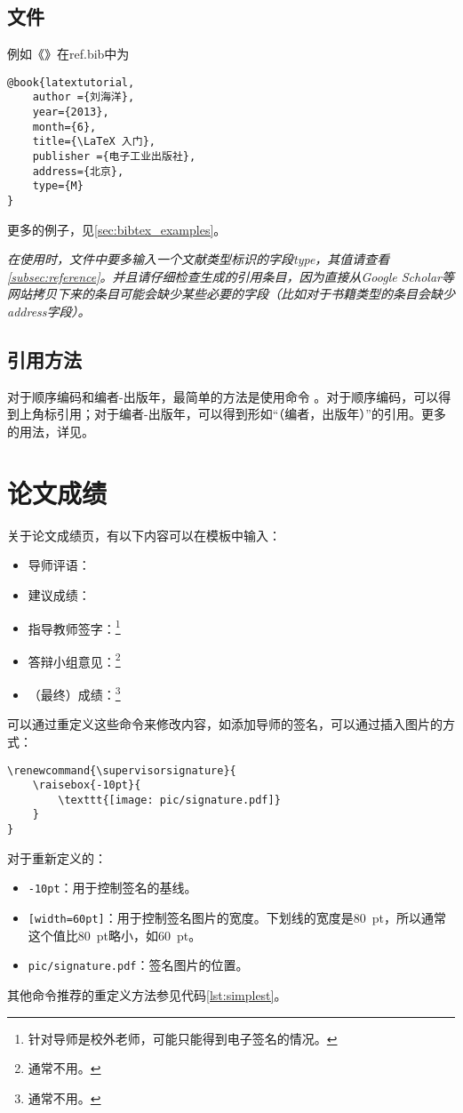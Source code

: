 \documentclass[oneside]{LZU}
\newenvironment{note}{\par\itshape\noindent{\makebox[-5pt][r]{\scriptsize\color{red!90}\textdbend\quad}}}{\par}
\newcommand{\filename}[1]{{\ttfamily #1}}
\begin{document}
\subsection{文件}
例如《》\supercite{latextutorial}在\filename{ref.bib}中为
\begin{verbatim}
@book{latextutorial,
    author ={刘海洋},
    year={2013},
    month={6},
    title={\LaTeX 入门},
    publisher ={电子工业出版社},
    address={北京},
    type={M}
}
\end{verbatim}
更多的例子，见\cref{sec:bibtex_examples}。
\begin{note}
    在使用时，文件中要多输入一个文献类型标识的字段type，其值请查看\cref{subsec:reference}。并且请仔细检查生成的引用条目，因为直接从Google Scholar等网站拷贝下来的条目可能会缺少某些必要的字段（比如对于书籍类型的条目会缺少address字段）。
\end{note}
\subsection{引用方法}
对于顺序编码和编者-出版年，最简单的方法是使用\texttt{\autocite{key}}命令
。对于顺序编码，可以得到上角标引用；对于编者-出版年，可以得到形如“（编者，出版年）”的引用。更多的用法，详见\cite{biblatex-gbt}。

\section{论文成绩}
关于论文成绩页，有以下内容可以在模板中输入：
\begin{itemize}
    \item 导师评语：\texttt{\supervisorcomment}
    \item 建议成绩：\texttt{\recommendedgrade}
    \item 指导教师签字：\texttt{\supervisorsignature}\footnote{针对导师是校外老师，可能只能得到电子签名的情况。}
    \item 答辩小组意见：\texttt{\committeecomment}\footnote{通常不用。}
    \item （最终）成绩：\texttt{\finalgrade}\footnote{通常不用。}
\end{itemize}
可以通过重定义这些命令来修改内容，如添加导师的签名，可以通过插入图片的方式：
\begin{verbatim}
\renewcommand{\supervisorsignature}{
    \raisebox{-10pt}{
        \texttt{[image: pic/signature.pdf]}
    }
}
\end{verbatim}
对于重新定义的\texttt{\supervisorsignature}：
\begin{itemize}
    \item \texttt{{-10pt}}：用于控制签名的基线。
    \item \texttt{[width=60pt]}：用于控制签名图片的宽度。下划线的宽度是\SI{80}{pt}，所以通常这个值比\SI{80}{pt}略小，如\SI{60}{pt}。
    \item \texttt{pic/signature.pdf}：签名图片的位置。
\end{itemize}
其他命令推荐的重定义方法参见代码\ref{lst:simplest}。
\end{document}
